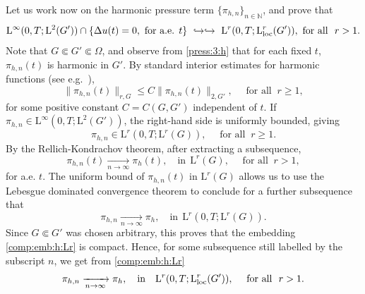 \documentclass[12pt,reqno]{amsart}
\numberwithin{equation}{section}
\theoremstyle{definition}
\def\L{\mathrm{L}}
\def\N{\mathbb{N}}
\begin{document}
\bigskip
{
Let us work now on the harmonic pressure term $\{\pi_{h,n}\}_{n\in\N}$, and prove that
\begin{align}\label{comp:emb:h:Lr}
	\L^\infty(0,T;\L^2(G'))\cap \{\Delta u(t)=0, \text{ for a.e. } t \}\ \hookrightarrow\hookrightarrow\  {\L^r(0,T;\L^r_{\rm{loc}}(G'))}, \text{ for all }\ r>1.
\end{align}
Note that $G\Subset G'\Subset \Omega$, and observe from \eqref{press:3:h} that for each fixed $t$, $\pi_{h,n}(t)$ is harmonic in $G'$.
By standard interior estimates for harmonic functions (see e.g.~\cite[Theorem~2.10]{GT:1998}),
\begin{equation*}
\|\pi_{h,n}(t)\|_{r,G}\leq C\|\pi_{h,n}(t)\|_{2,G'},\quad \text{ for all }\ r\geq 1,
\end{equation*}
for some positive constant $C=C(G,G')$ independent of $t$.
If $\pi_{h,n}\in \L^\infty(0,T;\L^2(G'))$, the right-hand side is uniformly bounded, giving
\begin{equation*}
\pi_{h,n}\in \L^r(0,T;\L^r(G)),\quad \text{ for all }\ r\geq 1.
\end{equation*}
By the Rellich-Kondrachov theorem, after extracting a subsequence,
\begin{equation*}
\pi_{h,n}(t)\xrightarrow[n \to \infty]{}\pi_{h}(t),\quad \mbox{in}\ \ \L^r(G),\quad \text{ for all }\ r> 1,
\end{equation*}
for a.e. $t$.
The uniform bound of $\pi_{h,n}(t)$ in $\L^r(G)$ allows us to use the Lebesgue dominated convergence theorem to conclude for a further subsequence that
\begin{equation*}
\pi_{h,n}\xrightarrow[n \to \infty]{} \pi_{h}, \quad\text{in}\ \ \L^r(0,T;\L^r(G)).
\end{equation*}
Since $G\Subset G'$ was chosen arbitrary, this proves that the embedding \eqref{comp:emb:h:Lr} is compact.
}
Hence, for some subsequence still labelled by the subscript $n$, we get from \eqref{comp:emb:h:Lr}
\begin{equation}\label{5.12:a.e-:pi:n}
\pi_{h,n} \xrightarrow[n\to\infty]{} \pi_h,\quad \text{in}\quad \L^r(0,T;\L^r_{\rm{loc}}(G')),\quad \text{ for all }\ r> 1.
\end{equation}
\end{document}
